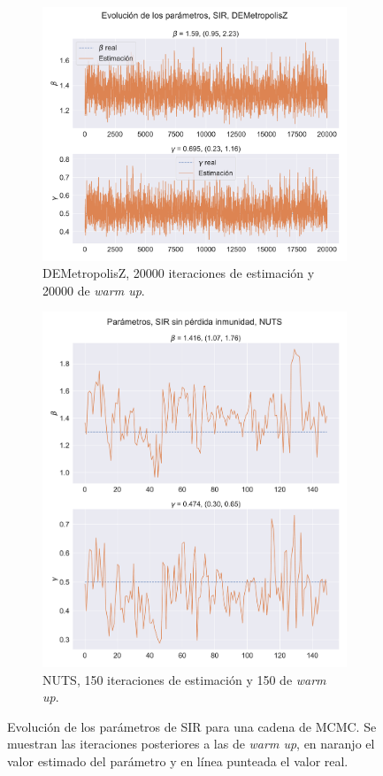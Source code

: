 \begin{figure}[h]
    \centering
    \begin{subfigure}[b]{0.49\linewidth}
        \includegraphics[width=0.7\linewidth]{img/content/chapter4/DEMetropolis_sir_params_trace.pdf}
        \caption{DEMetropolisZ, 20000 iteraciones de estimación y 20000 de \textit{warm up}.}
        \label{fig:DEMetropolis_sir_rec_params_trace}
    \end{subfigure}
    \begin{subfigure}[b]{0.49\linewidth}
        \includegraphics[width=0.7\linewidth]{img/content/chapter4/NUTS_sir_params_trace.pdf}
        \caption{NUTS, 150 iteraciones de estimación y 150 de \textit{warm up}.}
        \label{fig:NUTS_sir_params_trace}
    \end{subfigure}
    \caption{Evolución de los parámetros de SIR para una cadena de MCMC. Se muestran las iteraciones posteriores a las de \textit{warm up}, en naranjo el valor estimado del parámetro y en línea punteada el valor real.}
    \label{fig:MCMC_sir_params_trace}
\end{figure}

